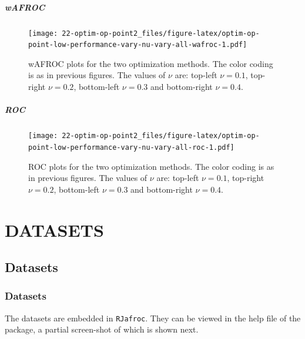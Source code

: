 \documentclass[
]{book}
\begin{document}
\hypertarget{wafroc-10}{%
\subsubsection{wAFROC}\label{wafroc-10}}

\begin{figure}
\centering
\texttt{[image: 22-optim-op-point2\_files/figure-latex/optim-op-point-low-performance-vary-nu-vary-all-wafroc-1.pdf]}
\caption{\label{fig:optim-op-point-low-performance-vary-nu-vary-all-wafroc}wAFROC plots for the two optimization methods. The color coding is as in previous figures. The values of \(\nu\) are: top-left \(\nu = 0.1\), top-right \(\nu = 0.2\), bottom-left \(\nu = 0.3\) and bottom-right \(\nu = 0.4\).}
\end{figure}

\hypertarget{roc-10}{%
\subsubsection{ROC}\label{roc-10}}

\begin{figure}
\centering
\texttt{[image: 22-optim-op-point2\_files/figure-latex/optim-op-point-low-performance-vary-nu-vary-all-roc-1.pdf]}
\caption{\label{fig:optim-op-point-low-performance-vary-nu-vary-all-roc}ROC plots for the two optimization methods. The color coding is as in previous figures. The values of \(\nu\) are: top-left \(\nu = 0.1\), top-right \(\nu = 0.2\), bottom-left \(\nu = 0.3\) and bottom-right \(\nu = 0.4\).}
\end{figure}

\hypertarget{part-datasets}{%
\part*{DATASETS}\label{part-datasets}}

\hypertarget{datasets}{%
\chapter{Datasets}\label{datasets}}

\hypertarget{datasets-datasets}{%
\section{Datasets}\label{datasets-datasets}}

The datasets are embedded in \texttt{RJafroc}. They can be viewed in the help file of the package, a partial screen-shot of which is shown next.
\end{document}
